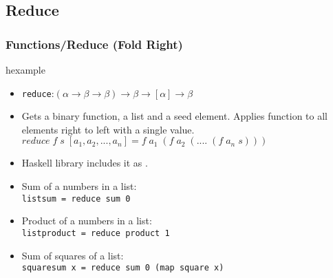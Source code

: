 
\subsection{Reduce}
\begin{frame}
\frametitle{Functions/Reduce (Fold Right)}
\begin{beamercolorbox}{hexample}
\codereduceH
\end{beamercolorbox}
\begin{itemize}
 \item \texttt{reduce}:$(\alpha \rightarrow \beta \rightarrow \beta) \rightarrow \beta  \rightarrow  [\alpha] \rightarrow \beta$
 \item Gets a binary function, a list and a seed element. Applies function
 to all elements right to left with a single value.\\
	$reduce\;f\;s\;[a_1,a_2,...,a_n] = f\;a_1\;(f\;a_2\;(....\;(f\;a_n\;s)))$
 \item Haskell library includes it as  .
\end{itemize}
\end{frame}


\begin{frame}
 \begin{itemize}
  \item Sum of a numbers in a list:\\
\texttt{listsum = reduce sum 0}
  \item Product of a numbers in a list:\\
\texttt{listproduct = reduce product 1}
  \item Sum of squares of a list:\\
\texttt{squaresum x = reduce sum 0 (map square x)}
 \end{itemize}
\end{frame}



